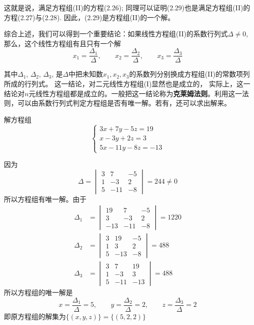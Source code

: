 这就是说，满足方程组(II)的方程(2.26); 同理可以证明(2.29)也是满足方程组(II)的方程(2.27)与(2.28). 因此，(2.29)是方程组(II)的一个解。

综合上述，我们可以得到一个重要结论：如果线性方程组(II)的系数行列式$\Delta\ne 0$, 那么，这个线性方程组有且只有一个解
\[x_1=\frac{\Delta_1}{\Delta},\qquad x_2=\frac{\Delta_2}{\Delta},\qquad x_3=\frac{\Delta_3}{\Delta}\]

其中$\Delta_1$, $\Delta_2$, $\Delta_3$, 是$\Delta$中把未知数$x_1,x_2,x_3$的系数列分别换成方程组(II)的常数项列所成的行列式。
这一结论，对二元线性方程组(I)显然也是成立的，
实际上，这一结论对$n$元线性方程组都是成立的。一般把这一结论称为\textbf{克莱姆法则}。利用这一法则，可以由系数行列式判定方程组是否有唯一解。若有，还可以求出解来。


\begin{example}
    解方程组
\[\begin{cases}
    3 x+7 y-5 z=19 \\
x-3 y+2 z=3 \\
5 x-11 y-8 z=-13
\end{cases}\]
\end{example}

\begin{solution}
    因为
    \[\Delta=\begin{vmatrix}
        3 & 7 & -5 \\
        1 & -3 & 2 \\
        5 & -11 & -8
        \end{vmatrix}=244 \ne 0\]
        所以方程组有唯一解。由于
\[\begin{split}
\Delta_{1}&=\begin{vmatrix}
    19 & 7 & -5 \\
3 & -3 & 2 \\
-13 & -11 & -8
\end{vmatrix}=1220\\
\Delta_{2}&=\begin{vmatrix}
    3 & 19 & -5 \\
1 & 3 & 2 \\
5 & -13 & -8
\end{vmatrix}=488\\
\Delta_{3}&=\begin{vmatrix}
    3 & 7 & 19 \\
1 & -3 & 3 \\
5 & -11 & -13
\end{vmatrix}=488
\end{split}\]
所以方程组的唯一解是
$$
x=\frac{\Delta_{1}}{\Delta}=5, \qquad y=\frac{\Delta_{2}}{\Delta}=2, \qquad z=\frac{\Delta_{3}}{\Delta}=2
$$
即原方程组的解集为$\{(x, y, z)\}=\{(5,2,2)\}$
\end{solution}

